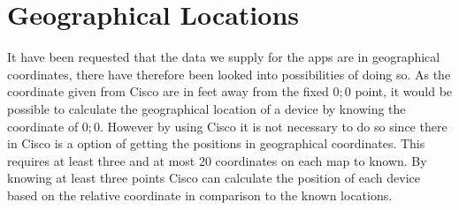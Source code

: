 \section{Geographical Locations}
It have been requested that the data we supply for the apps are in geographical coordinates, there have therefore been looked into possibilities of doing so.
As the coordinate given from Cisco are in feet away from the fixed ${0;0}$ point, it would be possible to calculate the geographical location of a device by knowing the coordinate of ${0;0}$. However by using Cisco it is not necessary to do so since there in Cisco is a option of getting the positions in geographical coordinates. This requires at least three and at most 20 coordinates on each map to known. By knowing at least three points Cisco can calculate the position of each device based on the relative coordinate in comparison to the known locations\cite{geo_cisco}.



